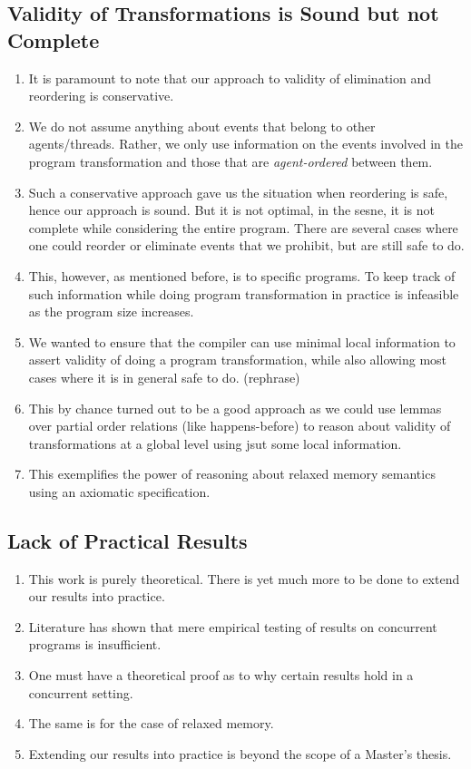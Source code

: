     \subsection{Validity of Transformations is Sound but not Complete}
    \begin{enumerate}
        \item It is paramount to note that our approach to validity of elimination and reordering is conservative. 
        \item We do not assume anything about events that belong to other agents/threads. Rather, we only use information on the events involved in the program transformation and those that are \textit{agent-ordered} between them. 
        \item Such a conservative approach gave us the situation when reordering is safe, hence our approach is sound. But it is not optimal, in the sesne, it is not complete while considering the entire program. There are several cases where one could reorder or eliminate events that we prohibit, but are still safe to do. 
        \item This, however, as mentioned before, is to specific programs. To keep track of such information while doing program transformation in practice is infeasible as the program size increases.
        \item We wanted to ensure that the compiler can use minimal local information to assert validity of doing a program transformation, while also allowing most cases where it is in general safe to do. (rephrase)
        \item This by chance turned out to be a good approach as we could use lemmas over partial order relations (like happens-before) to reason about validity of transformations at a  global level using jsut some local information. 
        \item This exemplifies the power of reasoning about relaxed memory semantics using an axiomatic specification.      
    \end{enumerate}
    
    \subsection{Lack of Practical Results}
    \begin{enumerate}
        \item This work is purely theoretical. There is yet much more to be done to extend our results into practice. 
        \item Literature has shown that mere empirical testing of results on concurrent programs is insufficient. 
        \item One must have a theoretical proof as to why certain results hold in a concurrent setting.
        \item The same is for the case of relaxed memory. 
        \item Extending our results into practice is beyond the scope of a Master's thesis. 
    \end{enumerate}


